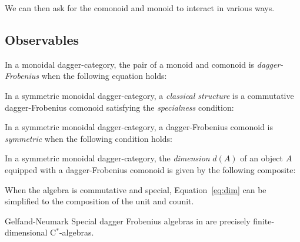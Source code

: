 We can then ask for the comonoid and monoid to interact in various ways.

\subsection{Observables}

\begin{defn}
In a monoidal dagger-category, the pair of a monoid  and comonoid  is \emph{dagger-Frobenius} when the following equation holds:
\begin{equation}
\label{eq:frobenius}

\end{equation}
\end{defn}

\begin{defn}
In a symmetric monoidal dagger-category, a \textit{classical structure} is a commutative dagger-Frobenius comonoid  satisfying the \textit{specialness} condition:
\begin{equation}

\end{equation}
\end{defn}


\begin{defn}
In a symmetric monoidal dagger-category, a dagger-Frobenius comonoid is \emph{symmetric} when the following condition holds:
\begin{equation}

\end{equation}
\end{defn}

\begin{defn}
In a symmetric monoidal dagger-category, the \emph{dimension} $d(A)$ of an object $A$ equipped with a dagger-Frobenius comonoid  is given by the following composite:
\begin{equation}
\label{eq:dim}

\end{equation}
\end{defn}
\noindent
When the algebra is commutative and special, Equation~\eqref{eq:dim} can be simplified to the composition of the unit and counit.

\begin{defn}
\end{defn}

\begin{theorem}{Gelfand-Neumark}
Special dagger Frobenius algebras in  are precisely finite-dimensional C$^*$-algebras.
\end{theorem}

